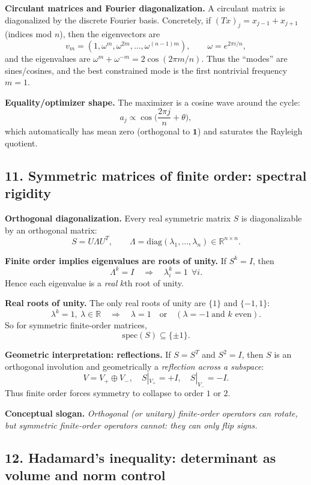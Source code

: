 \documentclass[12pt,a4paper]{article}
\theoremstyle{plain}
\theoremstyle{definition}      %
\begin{document}
\textbf{Circulant matrices and Fourier diagonalization.}
A circulant matrix is diagonalized by the discrete Fourier basis. Concretely, if $(Tx)_j=x_{j-1}+x_{j+1}$ (indices mod $n$), then the eigenvectors are
\[
v_m=(1,\omega^m,\omega^{2m},\dots,\omega^{(n-1)m}),\qquad \omega=e^{2\pi i/n},
\]
and the eigenvalues are $\omega^m+\omega^{-m}=2\cos(2\pi m/n)$.
Thus the ``modes'' are sines/cosines, and the best constrained mode is the first nontrivial frequency $m=1$.

\textbf{Equality/optimizer shape.}
The maximizer is a cosine wave around the cycle:
\[
a_j \propto \cos\!\Big(\frac{2\pi j}{n}+\theta\Big),
\]
which automatically has mean zero (orthogonal to $\mathbf 1$) and saturates the Rayleigh quotient.

\subsection*{11. Symmetric matrices of finite order: spectral rigidity}

\textbf{Orthogonal diagonalization.}
Every real symmetric matrix $S$ is diagonalizable by an orthogonal matrix:
\[
S=U\Lambda U^T,\qquad \Lambda=\mathrm{diag}(\lambda_1,\dots,\lambda_n)\in\mathbb R^{n\times n}.
\]

\textbf{Finite order implies eigenvalues are roots of unity.}
If $S^k=I$, then
\[
\Lambda^k=I \quad\Rightarrow\quad \lambda_i^k=1\ \ \forall i.
\]
Hence each eigenvalue is a \emph{real} $k$th root of unity.

\textbf{Real roots of unity.}
The only real roots of unity are $\{1\}$ and $\{-1,1\}$:
\[
\lambda^k=1,\ \lambda\in\mathbb R \quad\Rightarrow\quad \lambda=1
\quad\text{or}\quad (\lambda=-1\ \text{and $k$ even}).
\]
So for symmetric finite-order matrices,
\[
\mathrm{spec}(S)\subseteq\{\pm 1\}.
\]

\textbf{Geometric interpretation: reflections.}
If $S=S^T$ and $S^2=I$, then $S$ is an orthogonal involution and geometrically a \emph{reflection across a subspace}:
\[
V=V_+\oplus V_-,
\quad S|_{V_+}=+I,\quad S|_{V_-}=-I.
\]
Thus finite order forces symmetry to collapse to order $1$ or $2$.

\textbf{Conceptual slogan.}
\emph{Orthogonal (or unitary) finite-order operators can rotate, but symmetric finite-order operators cannot: they can only flip signs.}

\subsection*{12. Hadamard’s inequality: determinant as volume and norm control}
\end{document}
